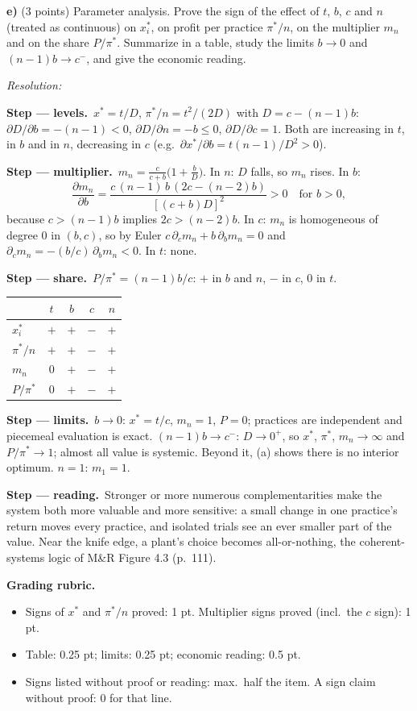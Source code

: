 \documentclass[11pt,a4paper]{article}
\newif\ifsolucoes
\newcommand{\espacoresol}{5cm}   %
\newcommand{\resolespaco}{\ifsolucoes\else\par\textit{Resolution:}\vspace{\espacoresol}\par\fi}
\newcommand{\passo}[2]{\par\smallskip\noindent\textbf{Step --- #1.}~#2}
\newcommand{\rubrica}[1]{\par\smallskip\noindent\textbf{Grading rubric.}\begin{itemize}[leftmargin=1.4em,topsep=1pt]#1\end{itemize}}
\begin{document}
\textbf{e)} (3 points) Parameter analysis. Prove the sign of the effect of $t$, $b$, $c$ and $n$
(treated as continuous) on $x_i^*$, on profit per practice $\pi^*/n$, on the multiplier $m_n$ and
on the share $P/\pi^*$. Summarize in a table, study the limits $b\to0$ and $(n-1)b\to c^-$, and
give the economic reading.
\resolespaco
\begin{sol}
\passo{levels}{$x^*=t/D$, $\pi^*/n=t^2/(2D)$ with $D=c-(n-1)b$: $\partial D/\partial b=-(n-1)<0$,
$\partial D/\partial n=-b\le0$, $\partial D/\partial c=1$. Both are increasing in $t$, in $b$ and in
$n$, decreasing in $c$ (e.g.\ $\partial x^*/\partial b=t(n-1)/D^2>0$).}
\passo{multiplier}{$m_n=\frac{c}{c+b}\big(1+\frac bD\big)$. In $n$: $D$ falls, so $m_n$ rises.
In $b$:
$$\frac{\partial m_n}{\partial b}=\frac{c\,(n-1)\,b\,(2c-(n-2)b)}{[(c+b)D]^2}>0\quad\text{for } b>0,$$
because $c>(n-1)b$ implies $2c>(n-2)b$. In $c$: $m_n$ is homogeneous of degree 0 in $(b,c)$, so
by Euler $c\,\partial_cm_n+b\,\partial_bm_n=0$ and $\partial_cm_n=-(b/c)\,\partial_bm_n<0$. In $t$: none.}
\passo{share}{$P/\pi^*=(n-1)b/c$: $+$ in $b$ and $n$, $-$ in $c$, $0$ in $t$.}
\begin{center}
\begin{tabular}{lcccc}\toprule
 & $t$ & $b$ & $c$ & $n$\\\midrule
$x_i^*$ & $+$ & $+$ & $-$ & $+$\\
$\pi^*/n$ & $+$ & $+$ & $-$ & $+$\\
$m_n$ & $0$ & $+$ & $-$ & $+$\\
$P/\pi^*$ & $0$ & $+$ & $-$ & $+$\\\bottomrule
\end{tabular}
\end{center}
\passo{limits}{$b\to0$: $x^*=t/c$, $m_n=1$, $P=0$; practices are independent and piecemeal
evaluation is exact. $(n-1)b\to c^-$: $D\to0^+$, so $x^*$, $\pi^*$, $m_n\to\infty$ and
$P/\pi^*\to1$; almost all value is systemic. Beyond it, (a) shows there is no interior optimum.
$n=1$: $m_1=1$.}
\passo{reading}{Stronger or more numerous complementarities make the system both more valuable
and more sensitive: a small change in one practice's return moves every practice, and isolated
trials see an ever smaller part of the value. Near the knife edge, a plant's choice becomes
all-or-nothing, the coherent-systems logic of M\&R Figure 4.3 (p.~111).}
\rubrica{
\item Signs of $x^*$ and $\pi^*/n$ proved: 1 pt. Multiplier signs proved (incl.\ the $c$ sign): 1 pt.
\item Table: 0.25 pt; limits: 0.25 pt; economic reading: 0.5 pt.
\item Signs listed without proof or reading: max.\ half the item. A sign claim without proof: 0 for that line.
}
\end{sol}
\end{document}
